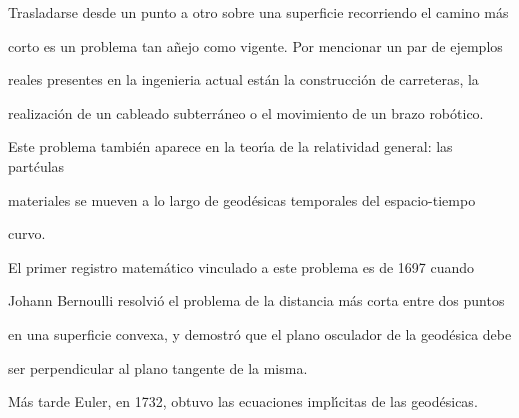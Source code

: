 \documentclass[a4paper,portrait,12pt]{article}
\begin{document}
\begin{flushleft}
Trasladarse desde un punto a otro sobre una superficie recorriendo el camino más
\end{flushleft}


\begin{flushleft}
corto es un problema tan añejo como vigente. Por mencionar un par de ejemplos
\end{flushleft}


\begin{flushleft}
reales presentes en la ingenieria actual están la construcción de carreteras, la
\end{flushleft}


\begin{flushleft}
realización de un cableado subterráneo o el movimiento de un brazo robótico.
\end{flushleft}


\begin{flushleft}
Este problema también aparece en la teor\i{}́a de la relatividad general: las partćulas
\end{flushleft}


\begin{flushleft}
materiales se mueven a lo largo de geodésicas temporales del espacio-tiempo
\end{flushleft}


\begin{flushleft}
curvo.
\end{flushleft}


\begin{flushleft}
El primer registro matemático vinculado a este problema es de 1697 cuando
\end{flushleft}


\begin{flushleft}
Johann Bernoulli resolvió el problema de la distancia más corta entre dos puntos
\end{flushleft}


\begin{flushleft}
en una superficie convexa, y demostró que el plano osculador de la geodésica debe
\end{flushleft}


\begin{flushleft}
ser perpendicular al plano tangente de la misma.
\end{flushleft}


\begin{flushleft}
Más tarde Euler, en 1732, obtuvo las ecuaciones impl\i{}́citas de las geodésicas.
\end{flushleft}
\end{document}
